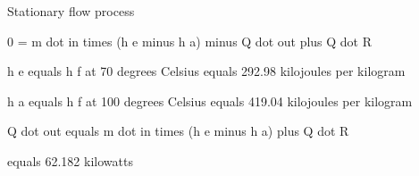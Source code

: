 Stationary flow process  

0 = m dot in times (h e minus h a) minus Q dot out plus Q dot R  

h e equals h f at 70 degrees Celsius equals 292.98 kilojoules per kilogram  

h a equals h f at 100 degrees Celsius equals 419.04 kilojoules per kilogram  

Q dot out equals m dot in times (h e minus h a) plus Q dot R  

equals 62.182 kilowatts